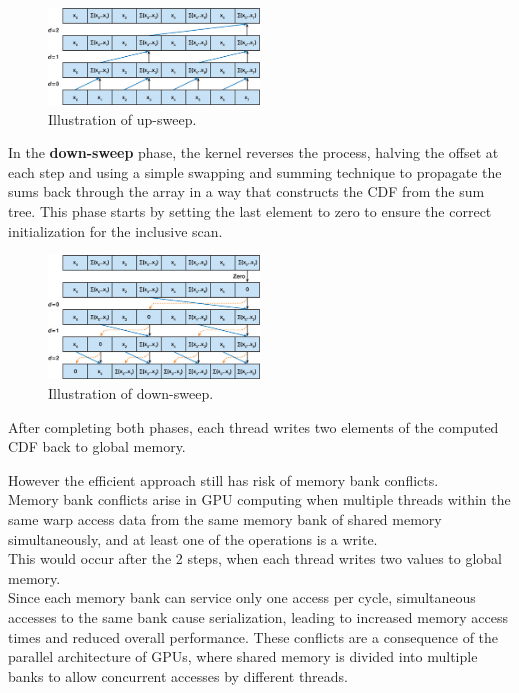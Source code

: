 \documentclass[10pt]{article}
\begin{document}
\begin{figure}[h]
\centering
\includegraphics[width=0.5\textwidth]{images/upsweep.jpg}
\caption{Illustration of up-sweep.}
\label{fig:upsweep}
\end{figure}



In the \textbf{down-sweep} phase, the kernel reverses the process, halving the offset at each step and using a simple swapping and summing technique to propagate the sums back through the array in a way that constructs the CDF from the sum tree. This phase starts by setting the last element to zero to ensure the correct initialization for the inclusive scan. \\

\begin{figure}[h]
\centering
\includegraphics[width=0.5\textwidth]{images/downsweep.jpg}
\caption{Illustration of down-sweep.}
\label{fig:downsweep}
\end{figure}
After completing both phases, each thread writes two elements of the computed CDF back to global memory. 

However the efficient approach still has risk of memory bank conflicts.\\
Memory bank conflicts arise in GPU computing when multiple threads within the same warp access data from the same memory bank of shared memory simultaneously, and at least one of the operations is a write.\\
This would occur after the 2 steps, when each thread writes two values to global memory. \\
Since each memory bank can service only one access per cycle, simultaneous accesses to the same bank cause serialization, leading to increased memory access times and reduced overall performance. These conflicts are a consequence of the parallel architecture of GPUs, where shared memory is divided into multiple banks to allow concurrent accesses by different threads.\\
\pagebreak
\end{document}
